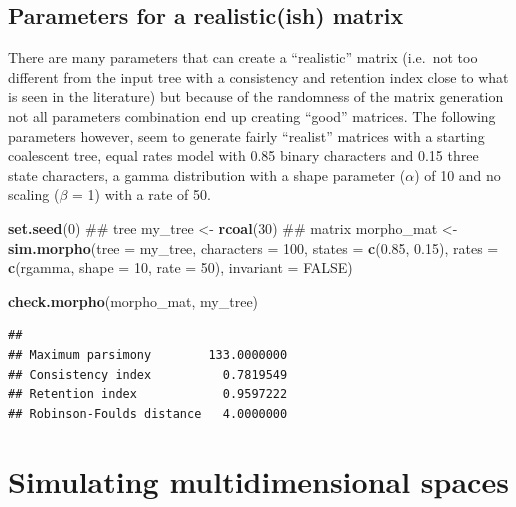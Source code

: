 \documentclass[]{book}
\newenvironment{Shaded}{\begin{snugshade}}{\end{snugshade}}
\newcommand{\KeywordTok}[1]{\textcolor[rgb]{0.13,0.29,0.53}{\textbf{#1}}}
\newcommand{\DataTypeTok}[1]{\textcolor[rgb]{0.13,0.29,0.53}{#1}}
\newcommand{\DecValTok}[1]{\textcolor[rgb]{0.00,0.00,0.81}{#1}}
\newcommand{\FloatTok}[1]{\textcolor[rgb]{0.00,0.00,0.81}{#1}}
\newcommand{\StringTok}[1]{\textcolor[rgb]{0.31,0.60,0.02}{#1}}
\newcommand{\OtherTok}[1]{\textcolor[rgb]{0.56,0.35,0.01}{#1}}
\newcommand{\NormalTok}[1]{#1}
\theoremstyle{definition}
\theoremstyle{definition}
\theoremstyle{definition}
\theoremstyle{remark}
\begin{document}
\subsection{Parameters for a realistic(ish)
matrix}\label{parameters-for-a-realisticish-matrix}

There are many parameters that can create a ``realistic'' matrix
(i.e.~not too different from the input tree with a consistency and
retention index close to what is seen in the literature) but because of
the randomness of the matrix generation not all parameters combination
end up creating ``good'' matrices. The following parameters however,
seem to generate fairly ``realist'' matrices with a starting coalescent
tree, equal rates model with 0.85 binary characters and 0.15 three state
characters, a gamma distribution with a shape parameter (\(\alpha\)) of
10 and no scaling (\(\beta\) = 1) with a rate of 50.

\begin{Shaded}
\begin{Highlighting}[]
\KeywordTok{set.seed}\NormalTok{(}\DecValTok{0}\NormalTok{)}
\NormalTok{## tree}
\NormalTok{my_tree <-}\StringTok{ }\KeywordTok{rcoal}\NormalTok{(}\DecValTok{30}\NormalTok{)}
\NormalTok{## matrix}
\NormalTok{morpho_mat <-}\StringTok{ }\KeywordTok{sim.morpho}\NormalTok{(}\DataTypeTok{tree =}\NormalTok{ my_tree, }\DataTypeTok{characters =} \DecValTok{100}\NormalTok{, }\DataTypeTok{states =} \KeywordTok{c}\NormalTok{(}\FloatTok{0.85}\NormalTok{,}
    \FloatTok{0.15}\NormalTok{), }\DataTypeTok{rates =} \KeywordTok{c}\NormalTok{(rgamma, }\DataTypeTok{shape =} \DecValTok{10}\NormalTok{, }\DataTypeTok{rate =} \DecValTok{50}\NormalTok{), }\DataTypeTok{invariant =} \OtherTok{FALSE}\NormalTok{)}

\KeywordTok{check.morpho}\NormalTok{(morpho_mat, my_tree)}
\end{Highlighting}
\end{Shaded}

\begin{verbatim}
##                                     
## Maximum parsimony        133.0000000
## Consistency index          0.7819549
## Retention index            0.9597222
## Robinson-Foulds distance   4.0000000
\end{verbatim}

\section{Simulating multidimensional
spaces}\label{simulating-multidimensional-spaces}
\end{document}

